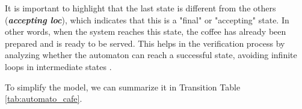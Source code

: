 It is important to highlight that the last state is different from the others (\textbf{\textit{accepting loc}}), which indicates that this is a "final" or "accepting" state. In other words, when the system reaches this state, the coffee has already been prepared and is ready to be served. This helps in the verification process by analyzing whether the automaton can reach a successful state, avoiding infinite loops in intermediate states \cite{IMITATOR}.

To simplify the model, we can summarize it in Transition Table \ref{tab:automato_cafe}.

\paragraph{}



\begin{table}[h!]
\centering
{}
\caption{Transition table of the coffee machine automaton.}
\label{tab:automato_cafe}
\end{table}



